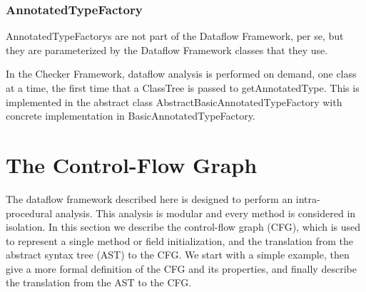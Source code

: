 

\subsubsection{AnnotatedTypeFactory}
\label{sec:annotated_type_factory_classes}

    AnnotatedTypeFactorys are not part of the Dataflow Framework, per se, but they are parameterized by the Dataflow Framework classes that they use.

    
    In the Checker Framework, dataflow analysis is performed on demand, one class at a time, the first time that a ClassTree is passed to getAnnotatedType.   This is implemented in the abstract class AbstractBasicAnnotatedTypeFactory with concrete implementation in BasicAnnotatedTypeFactory.
    
    






\section{The Control-Flow Graph}
\label{sec:cfg}


The dataflow framework described here is designed to perform an intra-procedural analysis.
This analysis is modular and every method is considered in isolation. In this section
we describe the control-flow graph (CFG), which is used to represent a single method or field initialization, and the
translation from the abstract syntax tree (AST) to the CFG. We start with a simple
example, then give a more formal definition of the CFG and its properties, and finally
describe the translation from the AST to the CFG.

